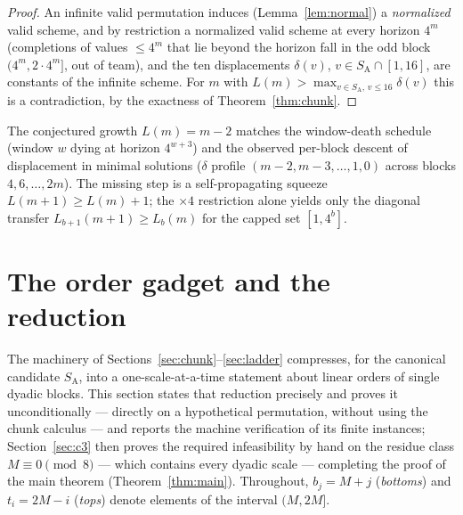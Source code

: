 \documentclass[11pt]{article}
\theoremstyle{definition}
\newcommand{\SA}{S_{\mathrm{A}}}
\begin{document}
\begin{proof}
An
infinite valid permutation induces (Lemma~\ref{lem:normal}) a
\emph{normalized} valid scheme, and by restriction a normalized valid
scheme at every horizon $4^m$ (completions of values $\le 4^m$ that lie
beyond the horizon fall in the odd block $(4^m, 2\cdot 4^m]$, out of
team), and the ten displacements $\delta(v)$, $v \in \SA \cap [1,16]$,
are constants of the infinite
scheme. For $m$ with $L(m) > \max_{v \in \SA,\, v\le 16}\delta(v)$ this is a
contradiction, by the exactness of Theorem~\ref{thm:chunk}.
\end{proof}

The conjectured growth $L(m) = m-2$ matches the window-death schedule
(window $w$ dying at horizon $4^{w+3}$) and the observed per-block descent
of displacement in minimal solutions ($\delta$ profile $(m{-}2, m{-}3,
\dots, 1, 0)$ across blocks $4, 6, \dots, 2m$). The missing step is a
self-propagating squeeze $L(m{+}1) \ge L(m) + 1$; the $\times 4$
restriction alone yields only the diagonal transfer
$L_{b+1}(m{+}1) \ge L_b(m)$ for the capped set $[1, 4^b]$.

\section{The order gadget and the reduction}\label{sec:og}

The machinery of Sections~\ref{sec:chunk}--\ref{sec:ladder} compresses,
for the canonical candidate $\SA$, into a one-scale-at-a-time statement
about linear orders of single dyadic blocks. This section states that
reduction precisely and proves it unconditionally --- directly on a
hypothetical permutation, without using the chunk calculus --- and reports
the machine verification of its finite instances; Section~\ref{sec:c3} then proves the
required infeasibility by hand on the residue class $M \equiv 0 \pmod 8$
--- which contains every dyadic scale --- completing the proof of the main
theorem (Theorem~\ref{thm:main}). Throughout,
$b_j = M + j$ (\emph{bottoms}) and $t_i = 2M - i$ (\emph{tops}) denote
elements of the interval $(M, 2M]$.
\end{document}
